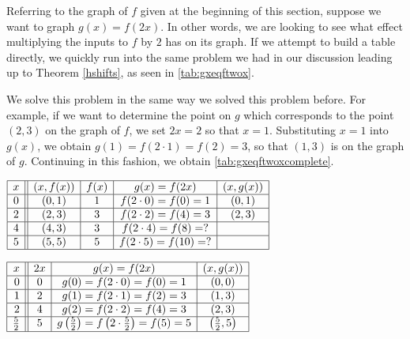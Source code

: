 Referring to the graph of $f$ given at the beginning of this section, suppose we want to graph $g(x) = f(2x)$.  In other words, we are looking to see what effect multiplying the inputs to $f$ by $2$ has on its graph.  If we attempt to build a table directly, we quickly run into the same problem we had in our discussion leading up to Theorem \ref{hshifts}, as seen in \autoref{tab:gxeqftwox}.  

We solve this problem in the same way we solved this problem before.  For example, if we want to determine the point on $g$ which corresponds to the point $(2,3)$ on the graph of $f$,  we set $2x =2 $ so that $x=1$.  Substituting $x=1$ into $g(x)$, we obtain $g(1) = f(2 \cdot 1) = f(2) = 3$, so that $(1,3)$ is on the graph of $g$. Continuing in this fashion, we obtain \autoref{tab:gxeqftwoxcomplete}.   

\begin{table}
\begin{center}
$ \begin{array}{|c||c|c|c|c|}  

\hline

x & (x,f(x)) & f(x)& g(x)=f(2x) & (x, g(x)) \\ \hline
0  & (0,1)& 1 & f(2 \cdot 0) = f(0) = 1   &(0, 1) \\  \hline
2 & (2,3) & 3 & f(2\cdot2) = f(4) = 3  &(2,3) \\  \hline
4 & (4,3) & 3 &  f(2 \cdot 4) = f(8) = ? &  \\  \hline
5 & (5,5) & 5 & f(2 \cdot 5) = f(10) = ?  &  \\  \hline

\end{array} $ 
\caption{}
\label{tab:gxeqftwox}
\end{center}
\end{table}

\begin{table}
\begin{center}
$ \begin{array}{|r||c|c|c|}  

\hline

x & 2x & g(x)=f(2x) & (x, g(x)) \\ \hline
0 & 0 & g(0)= f(2 \cdot 0) = f(0) = 1   &(0, 0) \\  \hline
1 &  2 &  g(1)=f(2 \cdot 1) = f(2)  = 3  &(1,3) \\  \hline
2 & 4  & g(2)=f(2 \cdot 2) = f(4) = 3 &  (2,3)\\  \hline
\frac{5}{2}  & 5 & g\left(\frac{5}{2}\right)=f\left(2 \cdot \frac{5}{2} \right) = f(5) = 5  & \left(\frac{5}{2},5\right) \\ [1pt] \hline

\end{array} $

\caption{}
\label{tab:gxeqftwoxcomplete}
\end{center}
\end{table} 

